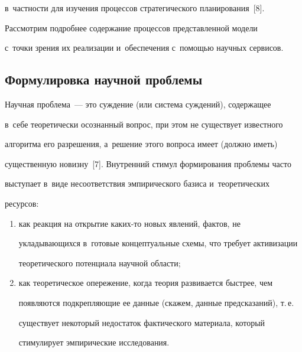 в~част\-ности для изучения процессов стратегического планирования~[8].

    

    Рассмотрим подробнее содержание процессов представленной модели 

с~точки зрения их реализации и~обеспечения с~помощью научных сервисов.

    



    

\subsection*{Формулировка научной проблемы}

    



    

    Научная проблема~--- это суждение (или система суждений), содержащее 

    в~себе теоретически осознанный вопрос, при этом не существует известного 

алгоритма его разрешения, а~решение этого вопроса имеет (должно иметь) 

существенную новизну~[7]. Внутренний стимул формирования проблемы часто 

выступает в~виде несоответствия эмпирического базиса и~теоретических 

ресурсов: 

    \begin{enumerate}[(1)]

    \item  как реакция на открытие ка\-ких-то новых явлений, фактов, не 

укладыва\-ющих\-ся в~готовые концептуальные схемы, что требует активизации 

теоретического потенциала научной области;



    \item как теоретическое опережение, когда теория развивается быстрее, чем 

появляются подкрепляющие ее данные (скажем, данные предсказаний), т.\,е.\ 

существует некоторый недостаток фактического материала, который 

стимулирует эмпирические исследования.

    \end{enumerate}

    

